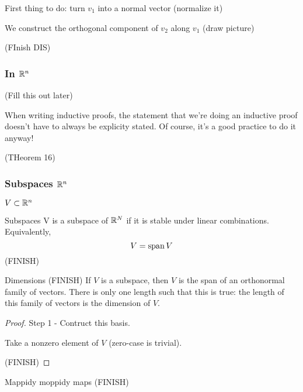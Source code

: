 \documentclass[11pt]{article}
\begin{document}
First thing to do: turn $v_1$ into a normal vector (normalize it)

We construct the orthogonal component of $v_2$ along $v_1$ (draw picture)

(FInish DIS)


\subsubsection{In $\mathbb R^n$}

(Fill this out later)

\begin{remark}
  When writing inductive proofs, the statement that we're doing an inductive proof doesn't have to always be explicity stated.
  Of course, it's a good practice to do it anyway!
\end{remark}

(THeorem 16)


\subsubsection{Subspaces $\mathbb R^n$}

$V \subset \mathbb R^n$

\begin{definition}{Subspaces}
  V is a subspace of $\mathbb R^N$ if it is stable under linear combinations.
  Equivalently,
  $$
  V = \operatorname{span} V
  $$
  (FINISH)
\end{definition}

\begin{theorem}{Dimensions}
  (FINISH)
  If $V$ is a subspace, then $V$ is the span of an orthonormal family of vectors.
  There is only one length such that this is true: the length of this family of vectors is the dimension of $V$.

  \begin{proof}
    Step 1 - Contruct this basis.

    Take a nonzero element of $V$ (zero-case is trivial).

    (FINISH)
  \end{proof}
\end{theorem}

Mappidy moppidy maps
(FINISH)












\end{document}
